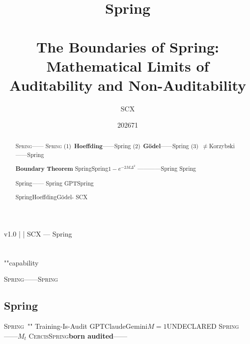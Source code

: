 \documentclass[12pt,a4paper]{article}
\title{\textbf{Spring\\[4pt]
}\\[12pt]
\large The Boundaries of Spring:\\
Mathematical Limits of Auditability and Non-Auditability}
\author{SCX}
\date{202671}
\theoremstyle{remark}
\newcommand{\Spring}{\textsc{Spring}}
\newcommand{\Cercis}{\textsc{Cercis}}
\begin{document}
\maketitle

\begin{center}
\footnotesize
\textbf{} v1.0 \quad | \quad
\textbf{}  \quad | \quad
\textbf{} SCX — Spring
\end{center}

\begin{abstract}
\Spring{}——
\Spring{}
(1)~\textbf{Hoeffding}——Spring
(2)~\textbf{G\"odel}——Spring
(3)~\textbf{$\neq$}Korzybski——Spring


\textbf{Boundary Theorem}
SpringSpring$1-e^{-2M\Delta^2}$
————Spring
Spring

Spring——
Spring
GPTSpring

\textbf{} SpringHoeffdingG\"odel-
SCX
\end{abstract}

\tableofcontents
\newpage

\section{}

\subsection{}

""capability



\Spring{}——\Spring{}
\textbf{}

\begin{center}
\boxed{\text{}}
\end{center}




\subsection{Spring}

\Spring{}~\cite{spring_framework}""
Training-Is-Audit
GPTClaudeGemini$M=1$\textsc{UNDECLARED}
\Spring{}——$M_t$
\Cercis{}\Spring{}\textbf{born audited}——
\end{document}
